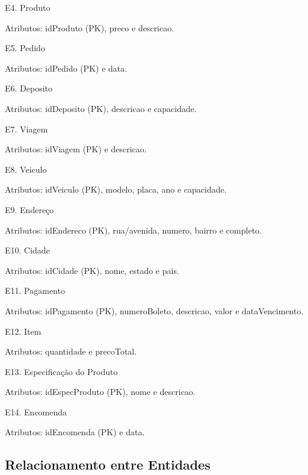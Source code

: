 \documentclass[12pt, onecolumn, titlepage]{article}
\begin{document}
\begin{description}
\item E4. Produto
\item \qquad Atributos: idProduto (PK), preco e descricao.

\item E5. Pedido
\item \qquad Atributos: idPedido (PK) e data.

\item E6. Deposito
\item \qquad Atributos: idDeposito (PK), descricao e capacidade.

\item E7. Viagem
\item \qquad Atributos: idViagem (PK) e descricao.

\item E8. Veiculo
\item \qquad Atributos: idVeiculo (PK), modelo, placa, ano e capacidade.

\item E9. Endereço
\item \qquad Atributos: idEndereco (PK), rua/avenida, numero, bairro e completo.

\item E10. Cidade
\item \qquad Atributos: idCidade (PK), nome, estado e pais.

\item E11. Pagamento
\item \qquad Atributos: idPagamento (PK), numeroBoleto, descricao, valor e dataVencimento.

\item E12. Item
\item \qquad Atributos: quantidade e precoTotal.

\item E13. Especificação do Produto
\item \qquad Atributos: idEspecProduto (PK), nome e descricao.

\item E14. Encomenda
\item \qquad Atributos: idEncomenda (PK) e data.

\end{description}

\subsection{Relacionamento entre Entidades}
\label{sect:relacionamento}
\end{document}

